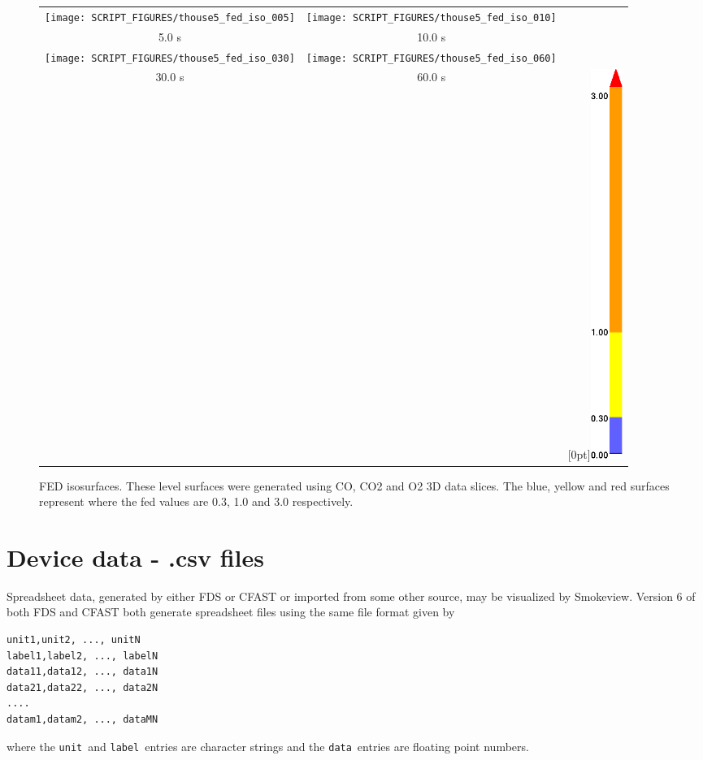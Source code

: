 \documentclass[11pt,twoside]{book}
\begin{document}
\begin{figure}[bph]
\begin{center}
\begin{tabular}{ccc}
\texttt{[image: SCRIPT\_FIGURES/thouse5\_fed\_iso\_005]}&
\texttt{[image: SCRIPT\_FIGURES/thouse5\_fed\_iso\_010]}\\
5.0 s&10.0 s\\
\texttt{[image: SCRIPT\_FIGURES/thouse5\_fed\_iso\_030]}&
\texttt{[image: SCRIPT\_FIGURES/thouse5\_fed\_iso\_060]}&\\
30.0 s&60.0 s
&\raisebox{0.0ex}[0pt]{\includegraphics[height=5.0in]{FIGURES/colorbar_fed}}\\
\end{tabular}
\caption [FED slices.]
{FED isosurfaces.
These level surfaces were generated using CO, CO2 and O2 3D data slices.
The blue, yellow and red surfaces represent where the
fed values are 0.3, 1.0 and 3.0 respectively.
}
\label{figfediso}%
\end{center}
\end{figure}

\section{Device data - .csv files}
Spreadsheet data, generated by either FDS or CFAST or imported from some
other source, may be visualized by Smokeview.
Version 6 of both FDS and CFAST
both generate spreadsheet files using the same file format given by
\begin{lstlisting}
unit1,unit2, ..., unitN
label1,label2, ..., labelN
data11,data12, ..., data1N
data21,data22, ..., data2N
....
datam1,datam2, ..., dataMN
\end{lstlisting}
where the {\tt unit}\ and {\tt label}\ entries are character strings and the
{\tt data}\ entries are floating point numbers.
\end{document}
